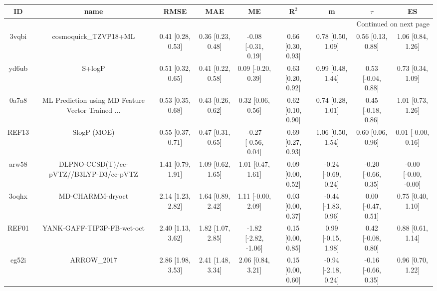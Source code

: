 \documentclass{article}
\begin{document}
\begin{center}
\scriptsize
\begin{longtable}{|ccccccccc|}
\toprule
    ID &                                               name &               RMSE &                MAE &                    ME &              R$^2$ &                    m &               $\tau$ &                    ES \\
\midrule
\endhead
\midrule
\multicolumn{9}{r}{{Continued on next page}} \\
\midrule
\endfoot

\bottomrule
\endlastfoot
 3vqbi &                              cosmoquick\_TZVP18+ML &  0.41 [0.28, 0.53] &  0.36 [0.23, 0.48] &   -0.08 [-0.31, 0.19] &  0.66 [0.30, 0.93] &    0.78 [0.50, 1.09] &    0.56 [0.13, 0.88] &     1.06 [0.84, 1.26] \\
 yd6ub &                                             S+logP &  0.51 [0.32, 0.65] &  0.41 [0.22, 0.58] &    0.09 [-0.20, 0.39] &  0.63 [0.20, 0.92] &    0.99 [0.48, 1.44] &   0.53 [-0.04, 0.88] &     0.73 [0.34, 1.09] \\
 0a7a8 &  ML Prediction using MD Feature Vector Trained ... &  0.53 [0.35, 0.68] &  0.43 [0.26, 0.62] &     0.32 [0.06, 0.56] &  0.62 [0.10, 0.90] &    0.74 [0.28, 1.01] &   0.45 [-0.18, 0.86] &     1.01 [0.73, 1.26] \\
 REF13 &                                        SlogP (MOE) &  0.55 [0.37, 0.71] &  0.47 [0.31, 0.65] &   -0.27 [-0.56, 0.04] &  0.69 [0.27, 0.93] &    1.06 [0.50, 1.54] &    0.60 [0.06, 0.96] &    0.01 [-0.00, 0.16] \\
 arw58 &            DLPNO-CCSD(T)/cc-pVTZ//B3LYP-D3/cc-pVTZ &  1.41 [0.79, 1.91] &  1.09 [0.62, 1.65] &     1.01 [0.47, 1.61] &  0.09 [0.00, 0.52] &  -0.24 [-0.69, 0.24] &  -0.20 [-0.66, 0.35] &  -0.00 [-0.00, -0.00] \\
 3oqhx &                                   MD-CHARMM-dryoct &  2.14 [1.23, 2.82] &  1.64 [0.89, 2.42] &    1.11 [-0.00, 2.09] &  0.03 [0.00, 0.37] &  -0.44 [-1.83, 0.96] &   0.00 [-0.47, 0.51] &     0.75 [0.40, 1.10] \\
 REF01 &                         YANK-GAFF-TIP3P-FB-wet-oct &  2.40 [1.13, 3.62] &  1.82 [1.07, 2.85] &  -1.82 [-2.82, -1.06] &  0.15 [0.00, 0.85] &   0.99 [-0.15, 1.98] &   0.42 [-0.08, 0.80] &     0.88 [0.61, 1.14] \\
 eg52i &                                        ARROW\_2017 &  2.86 [1.98, 3.53] &  2.41 [1.48, 3.34] &     2.06 [0.84, 3.21] &  0.15 [0.00, 0.60] &  -0.94 [-2.18, 0.24] &  -0.16 [-0.66, 0.35] &     0.96 [0.70, 1.22] \\
\end{longtable}
\end{center}
\end{document}
